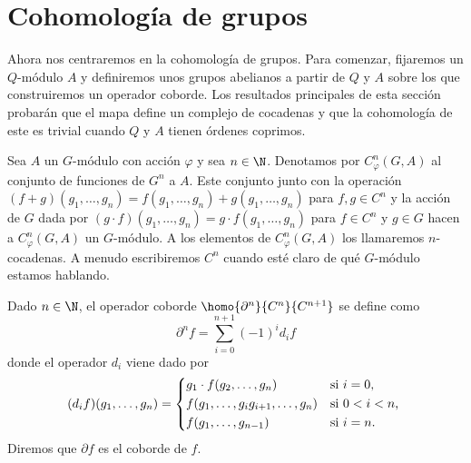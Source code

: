 \section{Cohomología de grupos}

Ahora nos centraremos en la cohomología de grupos. Para comenzar, fijaremos un $Q$-módulo $A$ y definiremos unos grupos abelianos a partir de $Q$ y $A$ sobre los que construiremos un operador coborde. Los resultados principales de esta sección probarán que el mapa define un complejo de cocadenas y que la cohomología de este es trivial cuando $Q$ y $A$ tienen órdenes coprimos. 

\begin{definicion}
	Sea $A$ un $G$-módulo con acción $\varphi$ y sea $n\in \N$. Denotamos por $C^n_\varphi(G,A)$ al conjunto de funciones de $G^n$ a $A$. Este conjunto junto con la operación $(f+g)(g_1,\ldots,g_n) = f(g_1,\ldots,g_n) + g(g_1,\ldots,g_n)$ para $f,g\in C^n$ y la acción de $G$ dada por $(g\cdot f)(g_1,\ldots,g_n) = g\cdot f(g_1,\ldots,g_n)$ para $f\in C^n$ y $g\in G$ hacen a $C^n_\varphi(G,A)$ un $G$-módulo. %
	A los elementos de $C^n_\varphi(G,A)$ los llamaremos $n$-cocadenas. A menudo escribiremos $C^n$ cuando esté claro de qué $G$-módulo estamos hablando. %

\end{definicion}


\begin{definicion}
	Dado $n\in \N$, el operador coborde $\homo {\partial^n} {C^n} {C^{n+1}}$ se define como
	\begin{equation*}
		\partial^n f = \sum\limits_{i=0}^{n+1} (-1)^{i} d_i f
	\end{equation*}
	donde el operador $d_i$ viene dado por 
	\[
		(d_if)(g_1,\ldots,g_n) = 
		\begin{cases*} %
			g_1\cdot f(g_2,\ldots,g_n) 				& si $ i=0$, \\
			f(g_1,\ldots,g_ig_{i+1},\ldots,g_n) 	& si $ 0 < i <n$, \\ %
			f(g_1,\ldots,g_{n-1}) 					& si $ i=n$.
		\end{cases*}
	\]
	Diremos que $\partial f$ es el coborde de $f$. %
\end{definicion}

